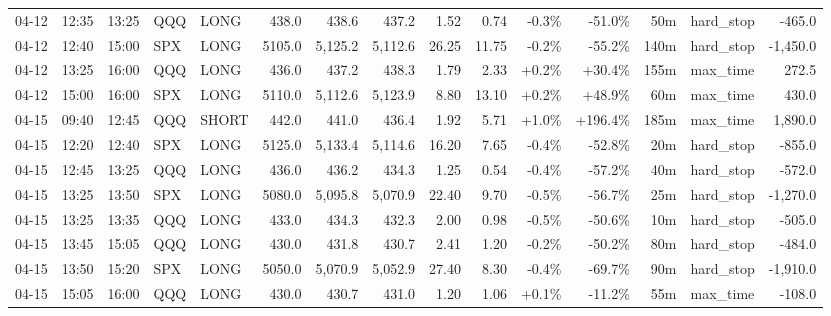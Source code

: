 \documentclass[11pt,a4paper,twoside]{article}
\begin{document}
\begin{landscape}
\begin{center}
\begin{longtable}{>{\color{txtmain}}l l l l l r r r r r r r r >{\color{txtmain}}l r}
04-12 & 12:35 & 13:25 & QQQ & LONG & 438.0 & 438.6 & 437.2 & 1.52 & 0.74 & \textcolor{lossred}{-0.3\%} & \textcolor{lossred}{-51.0\%} & 50m & hard\_stop & \textcolor{lossred}{-465.0} \\
04-12 & 12:40 & 15:00 & SPX & LONG & 5105.0 & 5,125.2 & 5,112.6 & 26.25 & 11.75 & \textcolor{lossred}{-0.2\%} & \textcolor{lossred}{-55.2\%} & 140m & hard\_stop & \textcolor{lossred}{-1,450.0} \\
04-12 & 13:25 & 16:00 & QQQ & LONG & 436.0 & 437.2 & 438.3 & 1.79 & 2.33 & \textcolor{wingreen}{+0.2\%} & \textcolor{wingreen}{+30.4\%} & 155m & max\_time & \textcolor{wingreen}{272.5} \\
04-12 & 15:00 & 16:00 & SPX & LONG & 5110.0 & 5,112.6 & 5,123.9 & 8.80 & 13.10 & \textcolor{wingreen}{+0.2\%} & \textcolor{wingreen}{+48.9\%} & 60m & max\_time & \textcolor{wingreen}{430.0} \\
04-15 & 09:40 & 12:45 & QQQ & SHORT & 442.0 & 441.0 & 436.4 & 1.92 & 5.71 & \textcolor{wingreen}{+1.0\%} & \textcolor{wingreen}{+196.4\%} & 185m & max\_time & \textcolor{wingreen}{1,890.0} \\
04-15 & 12:20 & 12:40 & SPX & LONG & 5125.0 & 5,133.4 & 5,114.6 & 16.20 & 7.65 & \textcolor{lossred}{-0.4\%} & \textcolor{lossred}{-52.8\%} & 20m & hard\_stop & \textcolor{lossred}{-855.0} \\
04-15 & 12:45 & 13:25 & QQQ & LONG & 436.0 & 436.2 & 434.3 & 1.25 & 0.54 & \textcolor{lossred}{-0.4\%} & \textcolor{lossred}{-57.2\%} & 40m & hard\_stop & \textcolor{lossred}{-572.0} \\
04-15 & 13:25 & 13:50 & SPX & LONG & 5080.0 & 5,095.8 & 5,070.9 & 22.40 & 9.70 & \textcolor{lossred}{-0.5\%} & \textcolor{lossred}{-56.7\%} & 25m & hard\_stop & \textcolor{lossred}{-1,270.0} \\
04-15 & 13:25 & 13:35 & QQQ & LONG & 433.0 & 434.3 & 432.3 & 2.00 & 0.98 & \textcolor{lossred}{-0.5\%} & \textcolor{lossred}{-50.6\%} & 10m & hard\_stop & \textcolor{lossred}{-505.0} \\
04-15 & 13:45 & 15:05 & QQQ & LONG & 430.0 & 431.8 & 430.7 & 2.41 & 1.20 & \textcolor{lossred}{-0.2\%} & \textcolor{lossred}{-50.2\%} & 80m & hard\_stop & \textcolor{lossred}{-484.0} \\
04-15 & 13:50 & 15:20 & SPX & LONG & 5050.0 & 5,070.9 & 5,052.9 & 27.40 & 8.30 & \textcolor{lossred}{-0.4\%} & \textcolor{lossred}{-69.7\%} & 90m & hard\_stop & \textcolor{lossred}{-1,910.0} \\
04-15 & 15:05 & 16:00 & QQQ & LONG & 430.0 & 430.7 & 431.0 & 1.20 & 1.06 & \textcolor{wingreen}{+0.1\%} & \textcolor{lossred}{-11.2\%} & 55m & max\_time & \textcolor{lossred}{-108.0} \\

\end{longtable}
\end{center}
\end{landscape}
\end{document}
